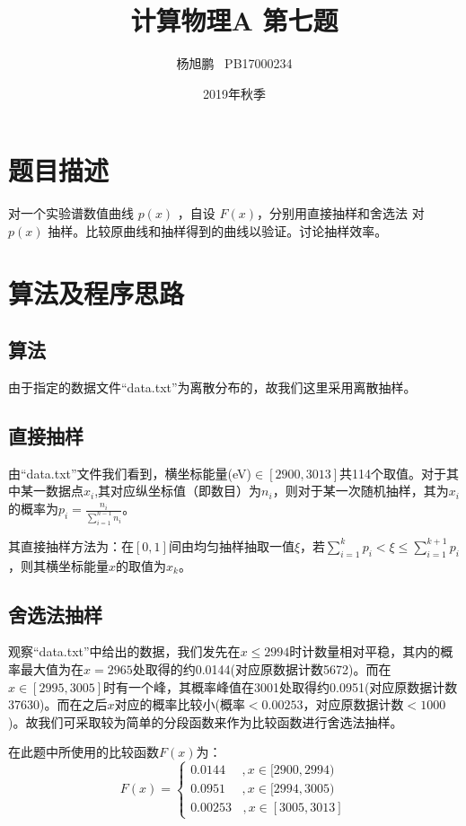 \documentclass[a4paper,11pt]{article}
\author{ 杨旭鹏  \  PB17000234}
\date{2019年秋季}
\title{计算物理A 第七题}
\begin{document}
\maketitle

\section{题目描述}
对一个实验谱数值曲线 $p(x)$ ，自设 $F(x)$，分别用直接抽样和舍选法 对 $p(x)$ 抽样。比较原曲线和抽样得到的曲线以验证。讨论抽样效率。

\section{算法及程序思路}
\subsection{算法}
由于指定的数据文件“data.txt”为离散分布的，故我们这里采用离散抽样。
\subsection{直接抽样}
由“data.txt”文件我们看到，横坐标能量(eV)$\in [2900,3013]$共114个取值。对于其中某一数据点$x_{i}$,其对应纵坐标值（即数目）为$n_{i}$，则对于某一次随机抽样，其为$x_{i}$的概率为$p_{i} = \frac{n_{i}}{\sum^{n-1}_{i=1}n_{i}}$。

其直接抽样方法为：在$[0,1]$间由均匀抽样抽取一值$\xi$，若$\sum^{k}_{i=1}p_{i}<\xi\leq \sum^{k+1}_{i=1}p_{i}$，则其横坐标能量$x$的取值为$x_{k}$。

\subsection{舍选法抽样}
观察“data.txt”中给出的数据，我们发先在$x \leq 2994$时计数量相对平稳，其内的概率最大值为在$x=2965$处取得的约0.0144(对应原数据计数5672)。而在$x \in [2995,3005]$时有一个峰，其概率峰值在3001处取得约0.0951(对应原数据计数37630)。而在之后$x$对应的概率比较小(概率$<0.00253$，对应原数据计数$<1000$)。故我们可采取较为简单的分段函数来作为比较函数进行舍选法抽样。

在此题中所使用的比较函数$F(x)$为：
\begin{equation}
F(x) = 
\left\{
\begin{array}{l}
	0.0144 ~~~~~~,x \in [2900,2994) \\
	0.0951 ~~~~~~,x \in [2994,3005) \\
	0.00253 ~~~~ ,x \in [3005,3013]
\end{array}
\right.
\end{equation}
\end{document}
